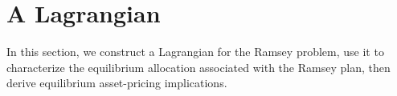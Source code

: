 \documentclass[12pt]{article}
\begin{document}
%	
%	
%	
%
%
%
%






\section{A  Lagrangian}\label{sec:Lagrangian1}

In this section, we construct a  Lagrangian for the Ramsey problem, use it to characterize the equilibrium allocation associated with the Ramsey plan, then derive equilibrium asset-pricing implications. 
\end{document}
